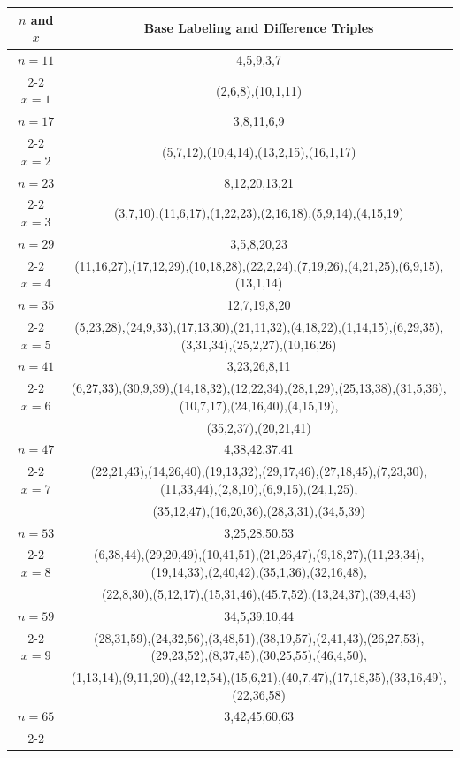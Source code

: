 \begin{tabular}{| c | c |}
\hline
\(n\) and \(x\) & Base Labeling and Difference Triples\\
\hline
\(n=11\) & 
4,5,9,3,7\\
\cline{2-2}
\(x=1\)
&(2,6,8),(10,1,11)\\
\hline 
\(n=17\) & 
3,8,11,6,9\\
\cline{2-2}
\(x=2\)
&(5,7,12),(10,4,14),(13,2,15),(16,1,17)\\
\hline 
\(n=23\) & 
8,12,20,13,21\\
\cline{2-2}
\(x=3\)
&(3,7,10),(11,6,17),(1,22,23),(2,16,18),(5,9,14),(4,15,19)\\
\hline 
\(n=29\) & 
3,5,8,20,23\\
\cline{2-2}
\(x=4\)
&(11,16,27),(17,12,29),(10,18,28),(22,2,24),(7,19,26),(4,21,25),(6,9,15),(13,1,14)\\
\hline 
\(n=35\) & 
12,7,19,8,20\\
\cline{2-2}
\(x=5\)
&(5,23,28),(24,9,33),(17,13,30),(21,11,32),(4,18,22),(1,14,15),(6,29,35),(3,31,34),(25,2,27),(10,16,26)\\
\hline 
\(n=41\) & 
3,23,26,8,11\\
\cline{2-2}
\(x=6\)
&(6,27,33),(30,9,39),(14,18,32),(12,22,34),(28,1,29),(25,13,38),(31,5,36),(10,7,17),(24,16,40),(4,15,19),\\
&(35,2,37),(20,21,41)\\
\hline 
\(n=47\) & 
4,38,42,37,41\\
\cline{2-2}
\(x=7\)
&(22,21,43),(14,26,40),(19,13,32),(29,17,46),(27,18,45),(7,23,30),(11,33,44),(2,8,10),(6,9,15),(24,1,25),\\
&(35,12,47),(16,20,36),(28,3,31),(34,5,39)\\
\hline 
\(n=53\) & 
3,25,28,50,53\\
\cline{2-2}
\(x=8\)
&(6,38,44),(29,20,49),(10,41,51),(21,26,47),(9,18,27),(11,23,34),(19,14,33),(2,40,42),(35,1,36),(32,16,48),\\
&(22,8,30),(5,12,17),(15,31,46),(45,7,52),(13,24,37),(39,4,43)\\
\hline 
\(n=59\) & 
34,5,39,10,44\\
\cline{2-2}
\(x=9\)
&(28,31,59),(24,32,56),(3,48,51),(38,19,57),(2,41,43),(26,27,53),(29,23,52),(8,37,45),(30,25,55),(46,4,50),\\
&(1,13,14),(9,11,20),(42,12,54),(15,6,21),(40,7,47),(17,18,35),(33,16,49),(22,36,58)\\
\hline 
\(n=65\) & 
3,42,45,60,63\\
\cline{2-2}

\end{tabular}
